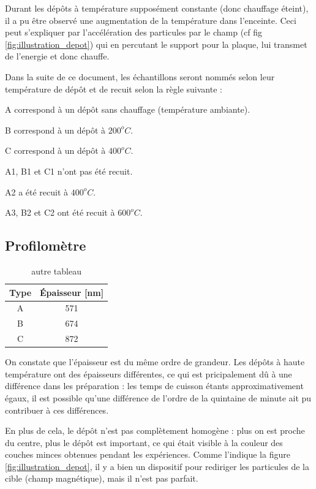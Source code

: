 \documentclass[a4paper,12pt,oneside]{article}
\begin{document}
Durant les dépôts à température supposément constante (donc chauffage éteint), il a pu être observé une augmentation de la température dans l'enceinte. Ceci peut s'expliquer par l'accélération des particules par le champ (cf fig \ref{fig:illustration_depot}) qui en percutant le support pour la plaque, lui transmet de l'energie et donc chauffe.

Dans la suite de ce document, les échantillons seront nommés selon leur température de dépôt et de recuit selon la règle suivante :

A correspond à un dépôt sans chauffage (température ambiante).

B correspond à un dépôt à $200^oC$.

C correspond à un dépôt à $400^oC$.

A1, B1 et C1 n'ont pas été recuit.

A2 a été recuit à $400^oC$.

A3, B2 et C2 ont été recuit à $600^oC$.

\subsection{Profilomètre}

\begin{table}[ht]
\centering
   \begin{tabular}{|c|c|}
	  \hline
	  Type & Épaisseur [nm]\\
	  \hline
	  A & 571 \\
	  B & 674 \\
	  C & 872 \\
	  \hline
   \end{tabular}
   \caption{autre tableau}\label{tab:profil}
\end{table}
On constate que l'épaisseur est du même ordre de grandeur. Les dépôts à haute température ont des épaisseurs différentes, ce qui est pricipalement dû à une différence dans les préparation : les temps de cuisson étants approximativement égaux, il est possible qu'une différence de l'ordre de la quintaine de minute ait pu contribuer à ces différences.

En plus de cela, le dépôt n'est pas complètement homogène : plus on est proche du centre, plus le dépôt est important, ce qui était visible à la couleur des couches minces obtenues pendant les expériences. Comme l'indique la figure \ref{fig:illustration_depot}, il y a bien un dispositif pour rediriger les particules de la cible (champ magnétique), mais il n'est pas parfait.
\end{document}
